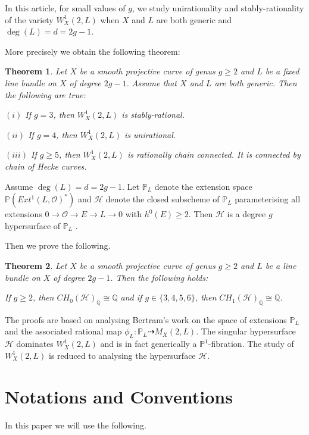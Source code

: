 \documentclass[12pt, reqno]{amsart}
\newtheorem{theorem}{Theorem}[section]
\begin{document}
In this article, for small values of $g$, we study unirationality and stably-rationality of the variety $W^{1}_{X}(2,L)$ when $X$ and $L$ are both generic and $\deg(L)=d=2g-1$. 

 More precisely we obtain the following theorem:
\begin{theorem}
    Let $X$ be a smooth projective curve of genus $g\geq 2$ and $L$ be a fixed line bundle on $X$ of degree $2g-1$. Assume that $X$ and $L$ are both generic. Then the following are true:

    $(i)$ If $g=3$, then $W^{1}_{X}(2,L)$ is stably-rational.    
    
    $(ii)$ If $g=4$, then $W^{1}_{X}(2,L)$ is unirational.  
    
    $(iii)$ If $g\geq 5$, then $W^1_X(2,L)$ is rationally chain connected. It is connected by chain of Hecke curves.
\end{theorem}


Assume $\deg(L)=d=2g-1$. Let $\mathbb{P}_{L}$ denote the extension space $\mathbb{P}(Ext^{1}(L,\mathcal{O})^{*})$ and $\mathcal{H}$ denote the closed subscheme of $\mathbb{P}_{L}$ parameterising all extensions $0\rightarrow \mathcal{O}\rightarrow E\rightarrow L\rightarrow 0$ with $h^{0}(E)\geq 2$. Then $\mathcal{H}$ is a degree $g$ hypersurface of $\mathbb{P}_{L}$ \cite[Definition-Claim 4.6]{b}.

Then we prove the following.
\begin{theorem}
Let $X$ be a smooth projective curve of genus $g\geq 2$ and $L$ be a line bundle on $X$ of degree $2g-1$. Then the following holds:

If $g\geq 2$, then $CH_{0}(\mathcal{H})_{\mathbb{Q}}\cong \mathbb{Q}$ and if $g\in\{3,4,5,6\}$, then $CH_{1}(\mathcal{H})_{\mathbb{Q}}\cong \mathbb{Q}$.


\end{theorem}

The proofs are based on analysing Bertram's work \cite{b} on the space of extensions $\mathbb{P}_{L}$ and the associated rational map $\phi_L:\mathbb{P}_{L} \dashrightarrow M_X(2,L)$.  The singular hypersurface $\mathcal{H}$ dominates $W^1_X(2,L)$ and is in fact generically a $\mathbb{P}^1$-fibration.  The study of $W^1_X(2,L)$ is reduced to analysing the hypersurface $\mathcal{H}$. 


\section{Notations and Conventions}
In this paper we will use the following.
\end{document}
